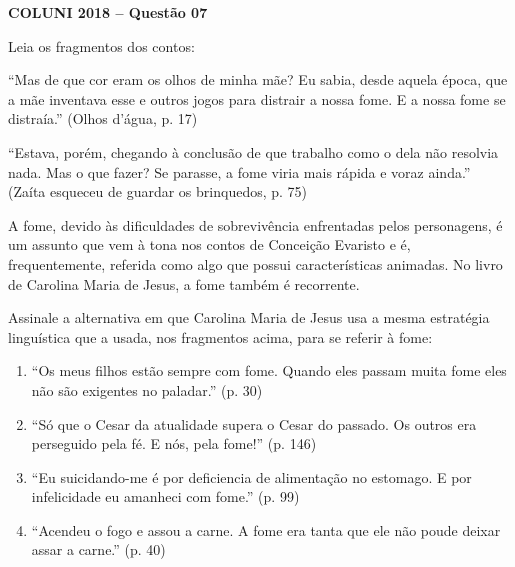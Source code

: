 \textbf{COLUNI 2018 -- Questão 07}\par\medskip Leia os fragmentos dos contos:

\par

“Mas de que cor eram os olhos de minha mãe? Eu sabia, desde aquela época, que a mãe inventava esse e outros jogos para distrair a nossa fome. E a nossa fome se distraía.” (Olhos d'água, p. 17)

\par

“Estava, porém, chegando à conclusão de que trabalho como o dela não resolvia nada. Mas o que fazer? Se parasse, a fome viria mais rápida e voraz ainda.” (Zaíta esqueceu de guardar os brinquedos, p. 75)

\par

A fome, devido às dificuldades de sobrevivência enfrentadas pelos personagens, é um assunto que vem à tona nos contos de Conceição Evaristo e é, frequentemente, referida como algo que possui características animadas. No livro de Carolina Maria de Jesus, a fome também é recorrente.

\par

Assinale a alternativa em que Carolina Maria de Jesus usa a mesma estratégia linguística que a usada, nos fragmentos acima, para se referir à fome:\begin{enumerate}
\item “Os meus filhos estão sempre com fome. Quando eles passam muita fome eles não são exigentes no
      paladar.” (p. 30)
\item “Só que o Cesar da atualidade supera o Cesar do passado. Os outros era perseguido pela fé. E nós, pela
      fome!” (p. 146)
\item “Eu suicidando-me é por deficiencia de alimentação no estomago. E por infelicidade eu amanheci com
      fome.” (p. 99)
\item “Acendeu o fogo e assou a carne. A fome era tanta que ele não poude deixar assar a carne.” (p. 40)\end{enumerate}
